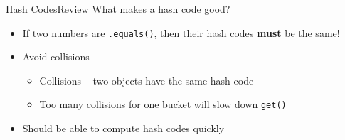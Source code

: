 \documentclass[9pt]{beamer}
\begin{document}
\begin{frame}{Hash Codes}{Review}
  What makes a hash code good?
  \begin{itemize}
    \pause
    \item
      If two numbers are {\tt .equals()}, then their hash codes {\bf must}
      be the same!
    \pause
    \item
      Avoid collisions
    \begin{itemize}
      \pause
      \item
        Collisions -- two objects have the same hash code
      \pause
      \item
        Too many collisions for one bucket will slow down {\tt get()}
    \end{itemize}
    \pause
    \item
      Should be able to compute hash codes quickly
  \end{itemize}
\end{frame}
\end{document}
